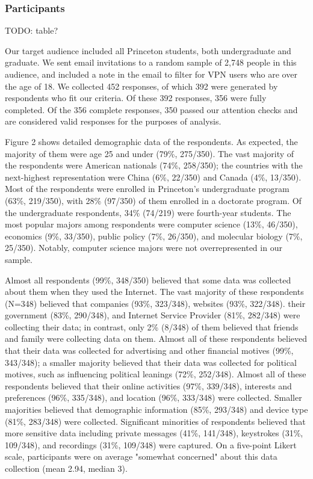 \subsubsection{Participants}

TODO: table?

Our target audience included all Princeton students, both undergraduate and
graduate. We sent email invitations to a random sample of 2,748 people in this
audience, and included a note in the email to filter for VPN users who are
over the age of 18. We collected 452 responses, of which 392 were generated by
respondents who fit our criteria. Of these 392 responses, 356 were fully
completed. Of the 356 complete responses, 350 passed our attention checks and
are considered valid responses for the purposes of analysis.

Figure 2 shows detailed demographic data of the respondents. As expected, the
majority of them were age 25 and under (79\%, 275/350). The vast majority of
the respondents were American nationals (74\%, 258/350); the countries with
the next-highest representation were China (6\%, 22/350) and Canada (4\%,
13/350). Most of the respondents were enrolled in Princeton's undergraduate
program (63\%, 219/350), with 28\% (97/350) of them enrolled in a doctorate
program. Of the undergraduate respondents, 34\% (74/219) were fourth-year
students. The most popular majors among respondents were computer science
(13\%, 46/350), economics (9\%, 33/350), public policy (7\%, 26/350), and
molecular biology (7\%, 25/350). Notably, computer science majors were not
overrepresented in our sample.

Almost all respondents (99\%, 348/350) believed that some data was collected
about them when they used the Internet. The vast majority of these respondents
(N=348) believed that companies (93\%, 323/348), websites (93\%, 322/348).
their government (83\%, 290/348), and Internet Service Provider (81\%,
282/348) were collecting their data; in contrast, only 2\% (8/348) of them
believed that friends and family were collecting data on them. Almost all of
these respondents believed that their data was collected for advertising and
other financial motives (99\%, 343/348); a smaller majority believed that
their data was collected for political motives, such as influencing political
leanings (72\%, 252/348). Almost all of these respondents believed that their
online activities (97\%, 339/348), interests and preferences (96\%, 335/348),
and location (96\%, 333/348) were collected. Smaller majorities believed that
demographic information (85\%, 293/348) and device type (81\%, 283/348) were
collected. Significant minorities of respondents believed that more sensitive
data including private messages (41\%, 141/348), keystrokes (31\%, 109/348),
and recordings (31\%, 109/348) were captured. On a five-point Likert scale,
participants were on average "somewhat concerned" about this data collection
(mean 2.94, median 3).

